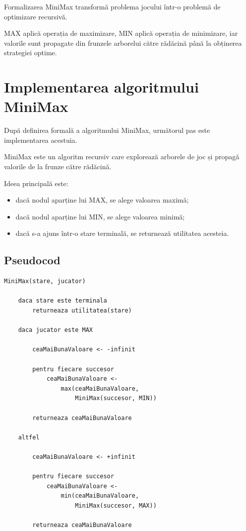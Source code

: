 \documentclass[12pt,a4paper]{article}
\begin{document}
Formalizarea MiniMax transformă problema jocului într-o problemă de optimizare recursivă.

MAX aplică operația de maximizare, MIN aplică operația de minimizare, iar valorile sunt propagate din frunzele arborelui către rădăcină până la obținerea strategiei optime.











\section{Implementarea algoritmului MiniMax}

După definirea formală a algoritmului MiniMax, următorul pas este implementarea acestuia.

MiniMax este un algoritm recursiv care explorează arborele de joc și propagă valorile de la frunze către rădăcină.

Ideea principală este:

\begin{itemize}
\item dacă nodul aparține lui MAX, se alege valoarea maximă;
\item dacă nodul aparține lui MIN, se alege valoarea minimă;
\item dacă s-a ajuns într-o stare terminală, se returnează utilitatea acesteia.
\end{itemize}

\subsection{Pseudocod}

\begin{verbatim}
MiniMax(stare, jucator)

    daca stare este terminala
        returneaza utilitatea(stare)

    daca jucator este MAX

        ceaMaiBunaValoare <- -infinit

        pentru fiecare succesor
            ceaMaiBunaValoare <-
                max(ceaMaiBunaValoare,
                    MiniMax(succesor, MIN))

        returneaza ceaMaiBunaValoare

    altfel

        ceaMaiBunaValoare <- +infinit

        pentru fiecare succesor
            ceaMaiBunaValoare <-
                min(ceaMaiBunaValoare,
                    MiniMax(succesor, MAX))

        returneaza ceaMaiBunaValoare
\end{verbatim}
\end{document}

